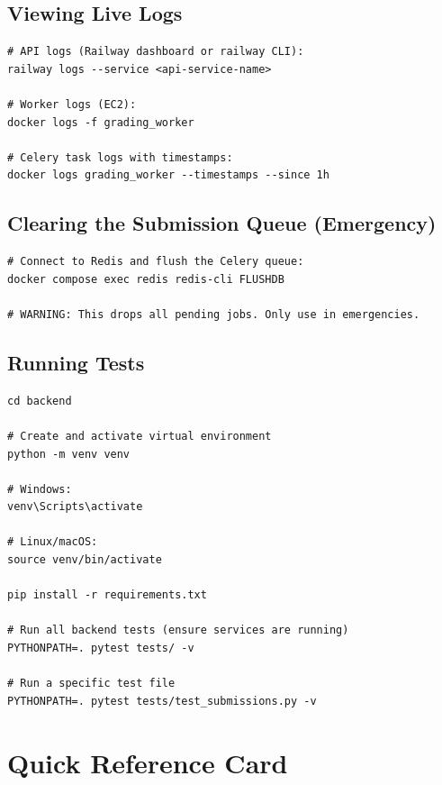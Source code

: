 \documentclass[12pt,a4paper]{article}
\begin{document}
\subsection{Viewing Live Logs}

\begin{lstlisting}[style=terminal]
# API logs (Railway dashboard or railway CLI):
railway logs --service <api-service-name>

# Worker logs (EC2):
docker logs -f grading_worker

# Celery task logs with timestamps:
docker logs grading_worker --timestamps --since 1h
\end{lstlisting}

\subsection{Clearing the Submission Queue (Emergency)}

\begin{lstlisting}[style=terminal]
# Connect to Redis and flush the Celery queue:
docker compose exec redis redis-cli FLUSHDB

# WARNING: This drops all pending jobs. Only use in emergencies.
\end{lstlisting}

\subsection{Running Tests}

\begin{lstlisting}[style=terminal]
cd backend

# Create and activate virtual environment
python -m venv venv

# Windows:
venv\Scripts\activate

# Linux/macOS:
source venv/bin/activate

pip install -r requirements.txt

# Run all backend tests (ensure services are running)
PYTHONPATH=. pytest tests/ -v

# Run a specific test file
PYTHONPATH=. pytest tests/test_submissions.py -v
\end{lstlisting}

\section{Quick Reference Card}
\end{document}
